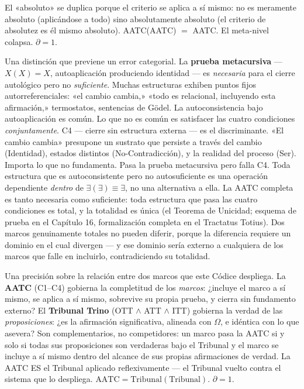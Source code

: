 \documentclass[10pt, openany, oneside]{book}
\begin{document}
\vspace{0.8em}

\noindent El «absoluto» se duplica porque el criterio se aplica a sí mismo: no es meramente absoluto (aplicándose a todo) sino absolutamente absoluto (el criterio de absolutez es él mismo absoluto). AATC(AATC) $=$ AATC. El meta-nivel colapsa. $\partial = 1$.

Una distinción que previene un error categorial. La \textbf{prueba metacursiva} --- $X(X) = X$, autoaplicación produciendo identidad --- es \textit{necesaria} para el cierre autológico pero no \textit{suficiente}. Muchas estructuras exhiben puntos fijos autorreferenciales: «el cambio cambia,» «todo es relacional, incluyendo esta afirmación,» termostatos, sentencias de G\"{o}del. La autoconsistencia bajo autoaplicación es común. Lo que no es común es satisfacer las cuatro condiciones \textit{conjuntamente}. C4 --- cierre sin estructura externa --- es el discriminante. «El cambio cambia» presupone un sustrato que persiste a través del cambio (Identidad), estados distintos (No-Contradicción), y la realidad del proceso (Ser). Importa lo que no fundamenta. Pasa la prueba metacursiva pero falla C4. Toda estructura que es autoconsistente pero no autosuficiente es una operación dependiente \textit{dentro} de $\exists(\exists) \equiv \exists$, no una alternativa a ella. La AATC completa es tanto necesaria como suficiente: toda estructura que pasa las cuatro condiciones es total, y la totalidad es única (el Teorema de Unicidad; esquema de prueba en el Capítulo 16, formalización completa en el Tractatus Totius). Dos marcos genuinamente totales no pueden diferir, porque la diferencia requiere un dominio en el cual divergen --- y ese dominio sería externo a cualquiera de los marcos que falle en incluirlo, contradiciendo su totalidad.

Una precisión sobre la relación entre dos marcos que este Códice despliega. La \textbf{AATC} (C1--C4) gobierna la completitud de los \textit{marcos}: ¿incluye el marco a sí mismo, se aplica a sí mismo, sobrevive su propia prueba, y cierra sin fundamento externo? El \textbf{Tribunal Trino} (OTT $\wedge$ ATT $\wedge$ ITT) gobierna la verdad de las \textit{proposiciones}: ¿es la afirmación significativa, alineada con $\Omega$, e idéntica con lo que asevera? Son complementarios, no competidores: un marco pasa la AATC si y solo si todas sus proposiciones son verdaderas bajo el Tribunal y el marco se incluye a sí mismo dentro del alcance de sus propias afirmaciones de verdad. La AATC ES el Tribunal aplicado reflexivamente --- el Tribunal vuelto contra el sistema que lo despliega. $\text{AATC} = \text{Tribunal}(\text{Tribunal})$. $\partial = 1$.
\end{document}
